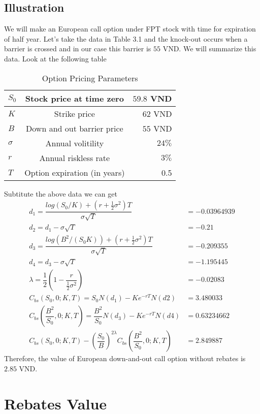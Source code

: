 \subsection*{Illustration}

We will make an European call option under FPT stock with time for expiration of half year. Let's take the data in Table 3.1 and the knock-out occurs when a barrier is crossed and in our case this barrier is $55$ VND. We will summarize this data. Look at the following table\\
\begin{table}[!htp]
	\centering
	\begin{tabular}{|l|c|r|}
		\hline
		$S_0$ & Stock price at time zero   & $59.8$ VND\\
		\hline
		$K$ & Strike price  & $62$ VND\\
		\hline
		$B$ & Down and out barrier price & $55$ VND\\
		\hline
		$\sigma$ &  Annual volitility & $24\%$\\
		\hline
		$r$ & Annual riskless rate  & $3\%$ \\
		\hline
		$T$ & Option expiration (in years)  & 0.5\\
		\hline	
	\end{tabular}
	\caption{Option Pricing Parameters}
	\label{B4.1}
\end{table}

Subtitute the above data we can get
\begin{align*}
	d_1=\dfrac{log(S_0/K)+(r+\frac{1}{2}\sigma^2)T}{\sigma\sqrt{T}}&= -0.03964939\\
	d_2=d_1-\sigma\sqrt{T}&=-0.21\\
	d_3=\dfrac{log(B^2/(S_0K))+(r+\frac{1}{2}\sigma^2)T}{\sigma\sqrt{T}}&=-0.209355\\
	d_4=d_3-\sigma\sqrt{T}&=-1.195445\\
	\lambda = \dfrac{1}{2}\left(1-\dfrac{r}{\frac{1}{2}\sigma^2}\right)&=  -0.02083\\
	C_{bs}(S_0,0;K,T)=S_0N(d_1)-Ke^{-rT}N(d2)&=3.480033\\
	C_{bs}(\dfrac{B^2}{S_0},0;K,T)=\dfrac{B^2}{S_0}N(d_3)-Ke^{-rT}N(d4)&=0.63234662\\
	C_{bs}(S_0,0;K,T)-\left(\dfrac{S_0}{B}\right)^{2\lambda}C_{bs}(\dfrac{B^2}{S_0},0;K,T)&= 2.849887	
\end{align*}
Therefore, the value of European down-and-out call option without rebates is $2.85$ VND.
\section{Rebates Value}

